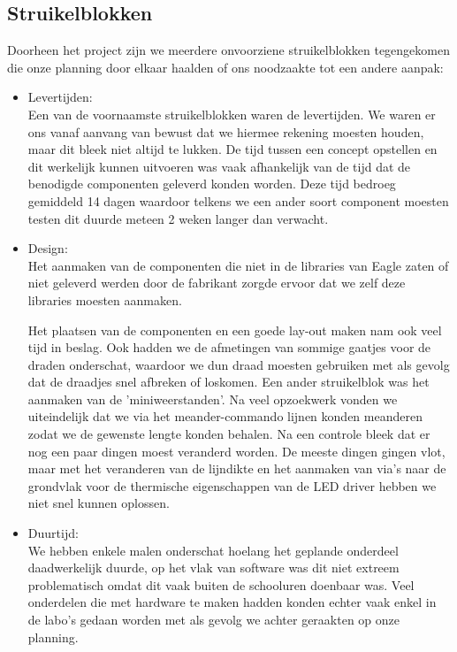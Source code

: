 \documentclass[a4paper,dutch]{article}
\begin{document}
\subsection{Struikelblokken}
Doorheen het project zijn we meerdere onvoorziene struikelblokken tegengekomen die onze planning door elkaar haalden of ons noodzaakte tot een andere aanpak:
\begin{itemize}
\item	Levertijden:\\
Een van de voornaamste struikelblokken waren de levertijden. We waren er ons vanaf aanvang van bewust dat we hiermee rekening moesten houden, maar dit bleek niet altijd te lukken. De tijd tussen een concept opstellen en dit werkelijk kunnen uitvoeren was vaak afhankelijk van de tijd dat de benodigde componenten geleverd konden worden. Deze tijd bedroeg gemiddeld 14 dagen waardoor telkens we een ander soort component moesten testen dit duurde meteen 2 weken langer dan verwacht. 

\item Design:\\
Het aanmaken van de componenten die niet in de libraries van Eagle zaten of niet geleverd werden door de fabrikant zorgde ervoor dat we zelf deze libraries moesten aanmaken.

Het plaatsen van de componenten en een goede lay-out maken nam ook veel tijd in beslag. Ook hadden we de afmetingen van sommige gaatjes voor de draden onderschat, waardoor we dun draad moesten gebruiken met als gevolg dat de draadjes snel afbreken of loskomen.
Een ander struikelblok was het aanmaken van de 'miniweerstanden'. Na veel opzoekwerk vonden we uiteindelijk dat we via het meander-commando lijnen konden meanderen zodat we de gewenste lengte konden behalen. 
Na een controle bleek dat er nog een paar dingen moest veranderd worden. De meeste dingen gingen vlot, maar met het veranderen van de lijndikte en het aanmaken van  via's naar de grondvlak voor de thermische eigenschappen van de LED driver hebben we niet snel kunnen oplossen. 

\item	Duurtijd:\\
We hebben enkele malen onderschat hoelang het geplande onderdeel daadwerkelijk duurde, op het vlak van software was dit niet extreem problematisch omdat dit vaak buiten de schooluren doenbaar was. Veel onderdelen die met hardware te maken hadden konden echter vaak enkel in de labo’s gedaan worden met als gevolg we achter geraakten op onze planning.


\end{itemize}
\end{document}
